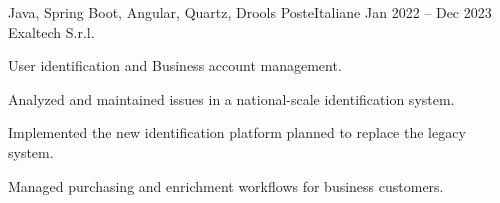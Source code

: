   \cventry
    {Java, Spring Boot, Angular, Quartz, Drools} %
    {PosteItaliane} %
    {Jan 2022 – Dec 2023} %
    {Exaltech S.r.l.} %
    {
      \begin{cvitems} %
        \item {User identification and Business account management.}
        \item {Analyzed and maintained issues in a national-scale identification system.}
        \item {Implemented the new identification platform planned to replace the legacy system.}  
        \item {Managed purchasing and enrichment workflows for business customers.}  
      \end{cvitems}
    }